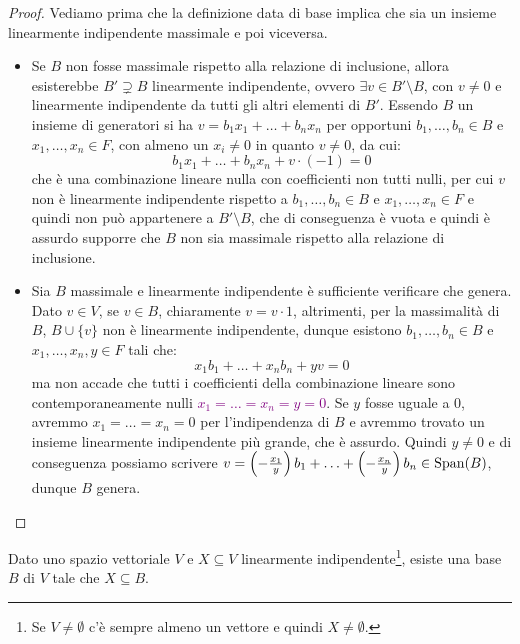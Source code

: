 \begin{proof}
	Vediamo prima che la definizione data di base implica che sia un insieme linearmente indipendente massimale e poi viceversa.
	\begin{itemize}
		\item[$\boxed{\Longrightarrow}$] Se $B$ non fosse massimale rispetto alla relazione di inclusione, allora esisterebbe $B' \supsetneq B$ linearmente indipendente, ovvero $\exists v \in B' \setminus B$, con $v \ne 0$ e linearmente indipendente da tutti gli altri elementi di $B'$. Essendo $B$ un insieme di generatori si ha
		$v = b_1x_1 + \ldots + b_nx_n$ per opportuni $b_1,\ldots,b_n \in B$ e $x_1,\ldots,x_n \in F$, con almeno un $x_i \ne 0$ in quanto $v \ne 0$, da cui:
		\[ b_1x_1 + \ldots + b_nx_n + v \cdot (-1) = 0
			\]
		che \`e una combinazione lineare nulla con coefficienti non tutti nulli, per cui $v$ non \`e linearmente indipendente rispetto a $b_1,\ldots,b_n \in B$ e $x_1,\ldots,x_n \in F$ e quindi non pu\`o appartenere a $B'\setminus B$, che di conseguenza \`e vuota e quindi \`e assurdo supporre che $B$ non sia massimale rispetto alla relazione di inclusione.
		\item[$\boxed{\Longleftarrow}$] Sia $B$ massimale e linearmente indipendente \`e sufficiente verificare che genera. Dato $v \in V$, se $v \in B$, chiaramente $v = v \cdot 1$, altrimenti, per la massimalit\`a di $B$, $B \cup \{v\}$ non \`e linearmente indipendente, dunque
		esistono $b_1,\ldots,b_n \in B$ e $x_1,\ldots,x_n,y \in F$ tali che:
		\[ x_1b_1 + \ldots + x_nb_n + yv = 0
			\]
		ma non accade che tutti i coefficienti della combinazione lineare sono contemporaneamente nulli \textcolor{purple}{$x_1 = \ldots = x_n = y = 0$}.
		Se $y$ fosse uguale a 0, avremmo $x_1 = \ldots = x_n = 0$ per l'indipendenza di $B$ e avremmo trovato un insieme linearmente indipendente pi\`u grande, che \`e assurdo.
		Quindi $y \ne 0$ e di conseguenza possiamo scrivere $v = \left(-\frac{x_1}{y}\right)b_1 + \ldots + \left(-\frac{x_n}{y}\right)b_n \in \Span(B)$, dunque $B$ genera.
	\end{itemize}
\end{proof}

\begin{proposition}
	Dato uno spazio vettoriale $V$ e $X \subseteq V$ linearmente indipendente\footnote{Se $V \ne\emptyset$ c'\`e sempre almeno un vettore e quindi $X \ne \emptyset$.}, esiste una base $B$ di $V$ tale che $X \subseteq B$.
\end{proposition}

